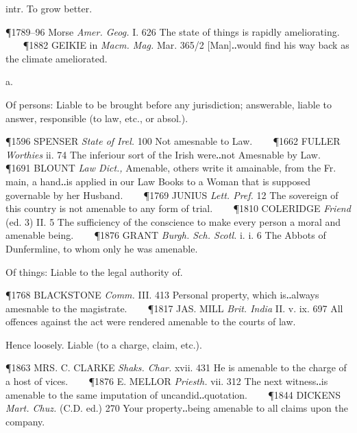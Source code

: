 \begin{description}[wide, labelwidth=!, labelindent=0pt]
\begin{myenumerate}
 intr. To grow better. 

\P 1789–96 Morse \textit{Amer. Geog.} I. 626 The state of things is rapidly ameliorating.    
\P 1882 GEIKIE in \textit{Macm. Mag.} Mar. 365/2 [Man]‥would find his way back as the climate ameliorated.
\end{myenumerate}


  a.

\noindent  {}

\noindent  
[apparently a. AFr. amenable (not in Godef.), f. amener to bring to or before, f. à to + mener to lead:—L. mināre to threaten, hence to drive cattle with minatory shouts. Cf. Sc. ca' = call and drive. The spelling amesnable is quite artificial, influenced by mesne, demesne, etc.] 
\vspace{-0.3cm}

\begin{myenumerate}
 Of persons: Liable to be brought before any jurisdiction; answerable, liable to answer, responsible (to law, etc., or absol.). 

\P 1596 SPENSER \textit{State of Irel.} 100 Not amesnable to Law.    
\P 1662 FULLER \textit{Worthies} ii. 74 The inferiour sort of the Irish were‥not Amesnable by Law.    
\P 1691 BLOUNT \textit{Law Dict.,} Amenable, others write it amainable, from the Fr. main, a hand‥is applied in our Law Books to a Woman that is supposed governable by her Husband.    
\P 1769 JUNIUS \textit{Lett. Pref.} 12 The sovereign of this country is not amenable to any form of trial.    
\P 1810 COLERIDGE \textit{Friend} (ed. 3) II. 5 The sufficiency of the conscience to make every person a moral and amenable being.    
\P 1876 GRANT \textit{Burgh. Sch. Scotl.} i. i. 6 The Abbots of Dunfermline, to whom only he was amenable.

 Of things: Liable to the legal authority of. 

\P 1768 BLACKSTONE \textit{Comm.} III. 413 Personal property, which is‥always amesnable to the magistrate.    
\P 1817 JAS. MILL \textit{Brit. India} II. v. ix. 697 All offences against the act were rendered amenable to the courts of law.

 Hence loosely. Liable (to a charge, claim, etc.). 

\P 1863 MRS. C. CLARKE \textit{Shaks. Char.} xvii. 431 He is amenable to the charge of a host of vices.    
\P 1876 E. MELLOR \textit{Priesth.} vii. 312 The next witness‥is amenable to the same imputation of uncandid‥quotation.    
\P 1844 DICKENS \textit{Mart. Chuz.} (C.D. ed.) 270 Your property‥being amenable to all claims upon the company.


\end{myenumerate}
\end{description}
